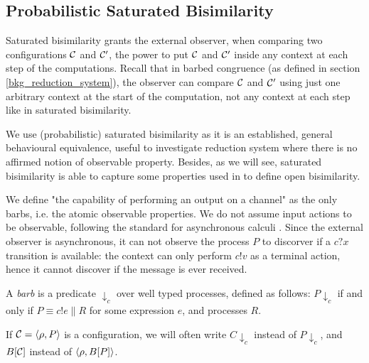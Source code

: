\subsection{Probabilistic Saturated Bisimilarity}

Saturated bisimilarity \cite{bonchiGeneralTheoryBarbs2014} grants the external observer, when comparing two configurations $\mathcal{C}$ and $\mathcal{C}'$, the power to put $\mathcal{C}$ and $\mathcal{C}'$ inside any context at each step of the computations. Recall that in barbed congruence (as defined in section \ref{bkg_reduction_system}), the observer can compare $\mathcal{C}$ and $\mathcal{C}'$ using just one arbitrary context at the start of the computation, not any context at each step like in saturated bisimilarity.

We use (probabilistic) saturated bisimilarity as it is an established, general behavioural equivalence, useful to investigate reduction system where there is no affirmed notion of observable property. Besides, as we will see, saturated bisimilarity is able to capture some properties used in \cite{dengOpenBisimulationQuantum2012} to define open bisimilarity.


We define "the capability of performing an output on a channel" as the only barbs, i.e. the atomic observable properties. We do not assume input actions to be observable, following the standard for asynchronous calculi \cite{amadioBisimulationsAsynchronousPcalculus1998}. Since the external observer is asynchronous, it can not observe the process $P$ to discorver if a $c?x$ transition is available: the context can only perform $c!v$ as a terminal action, hence it cannot discover if  the message is ever received.

\begin{definition}[Barb]
	A \emph{barb} is a predicate $\downarrow_{c}$ over well typed processes, defined as follows: $P \downarrow_{c}$ if and only if $P \equiv c!e \parallel R$ for some expression $e$, and processes $R$.
\end{definition}


If $\mathcal{C} = \langle\rho, P\rangle$ is a configuration, we will often write $C\downarrow_c$ instead of $P\downarrow_c$, and $B[\mathcal{C}]$ instead of $\langle\rho, B[P]\rangle$.

